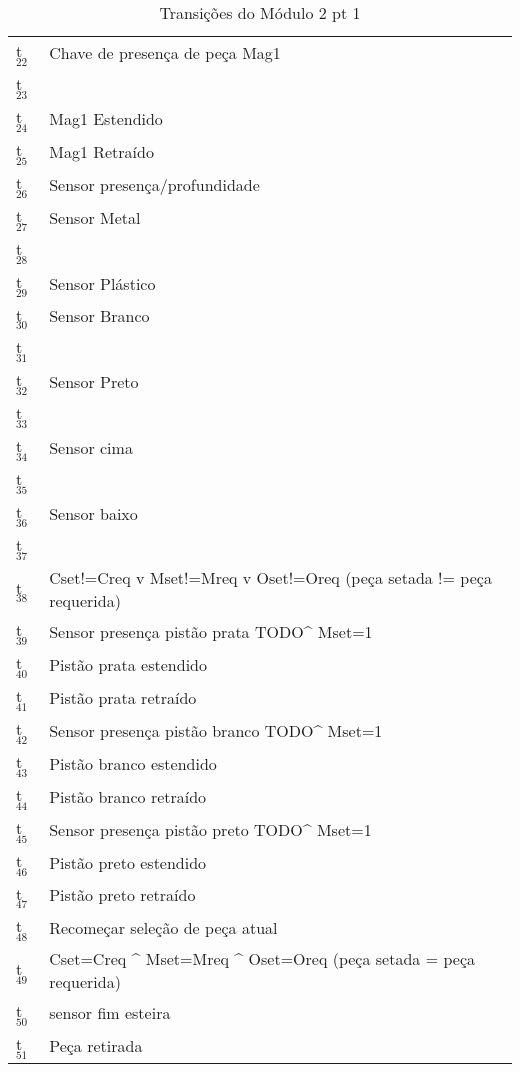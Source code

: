 \documentclass[11pt]{article}
\begin{document}
\begin{table}[htb]
\caption{Transições do Módulo 2 pt 1}
\centering
\begin{tabular}{ll}
t$_{\text{22}}$ & Chave de presença de peça Mag1\\
t$_{\text{23}}$ & \\
t$_{\text{24}}$ & Mag1 Estendido\\
t$_{\text{25}}$ & Mag1 Retraído\\
t$_{\text{26}}$ & Sensor presença/profundidade\\
t$_{\text{27}}$ & Sensor Metal\\
t$_{\text{28}}$ & \\
t$_{\text{29}}$ & Sensor Plástico\\
t$_{\text{30}}$ & Sensor Branco\\
t$_{\text{31}}$ & \\
t$_{\text{32}}$ & Sensor Preto\\
t$_{\text{33}}$ & \\
t$_{\text{34}}$ & Sensor cima\\
t$_{\text{35}}$ & \\
t$_{\text{36}}$ & Sensor baixo\\
t$_{\text{37}}$ & \\
t$_{\text{38}}$ & Cset!=Creq v Mset!=Mreq v Oset!=Oreq (peça setada != peça requerida)\\
t$_{\text{39}}$ & Sensor presença pistão prata TODO\^{} Mset=1\\
t$_{\text{40}}$ & Pistão prata estendido\\
t$_{\text{41}}$ & Pistão prata retraído\\
t$_{\text{42}}$ & Sensor presença pistão branco TODO\^{} Mset=1\\
t$_{\text{43}}$ & Pistão branco estendido\\
t$_{\text{44}}$ & Pistão branco retraído\\
t$_{\text{45}}$ & Sensor presença pistão preto TODO\^{} Mset=1\\
t$_{\text{46}}$ & Pistão preto estendido\\
t$_{\text{47}}$ & Pistão preto retraído\\
t$_{\text{48}}$ & Recomeçar seleção de peça atual\\
t$_{\text{49}}$ & Cset=Creq \^{} Mset=Mreq \^{} Oset=Oreq (peça setada = peça requerida)\\
t$_{\text{50}}$ & sensor fim esteira\\
t$_{\text{51}}$ & Peça retirada\\
\end{tabular}
\end{table}
\end{document}
